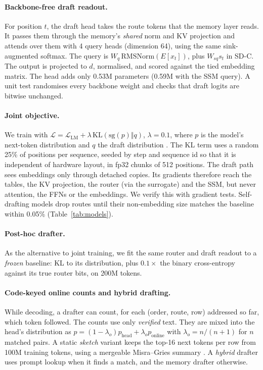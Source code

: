 \documentclass[11pt]{article}
\newcommand{\SDC}{\textsc{SD-C}}
\begin{document}
\paragraph{Backbone-free draft readout.}
For position $t$, the draft head takes the route tokens that the memory layer reads. It passes them through the memory's
\emph{shared} norm and KV projection and attends over them with 4 query heads (dimension 64), using the same sink-augmented
softmax. The query is $W_q\,\mathrm{RMSNorm}(E[x_t])$, plus $W_{sq}s_t$ in \SDC. The output is projected to $d$, normalised,
and scored against the tied embedding matrix. The head adds only 0.53M parameters (0.59M with the SSM query). A unit test
randomises every backbone weight and checks that draft logits are bitwise unchanged.

\paragraph{Joint objective.}
We train with $\mathcal{L}=\mathcal{L}_{\text{LM}}+\lambda\,\mathrm{KL}(\mathrm{sg}(p)\Vert q)$, $\lambda=0.1$, where $p$
is the model's next-token distribution and $q$ the draft distribution
\citep{hinton2015distilling,zhou2024distillspec}. The KL term uses a random 25\% of positions per sequence, seeded by step
and sequence id so that it is independent of hardware layout, in fp32 chunks of 512 positions. The draft path sees
embeddings only through detached copies. Its gradients therefore reach the tables, the KV projection, the router (via
the surrogate) and the SSM, but never attention, the FFNs or the embeddings. We verify this with gradient tests.
Self-drafting models drop routes until their non-embedding size matches the baseline within 0.05\% (Table~\ref{tab:models}).

\paragraph{Post-hoc drafter.}
As the alternative to joint training, we fit the same router and draft readout to a \emph{frozen} baseline: KL to its
distribution, plus $0.1\times$ the binary cross-entropy against its true router bits, on 200M tokens.

\paragraph{Code-keyed online counts and hybrid drafting.}
While decoding, a drafter can count, for each (order, route, row) addressed so far, which token followed. The counts use
only \emph{verified} text. They are mixed into the head's distribution as
$p=(1-\lambda_o)p_{\text{head}}+\lambda_o p_{\text{online}}$ with $\lambda_o=n/(n+1)$ for $n$ matched pairs. A static
\emph{sketch} variant keeps the top-16 next tokens per row from 100M training tokens, using a mergeable Misra--Gries
summary \citep{misra1982finding,metwally2005efficient}. A \emph{hybrid} drafter uses prompt lookup when it finds a
match, and the memory drafter otherwise.
\end{document}
